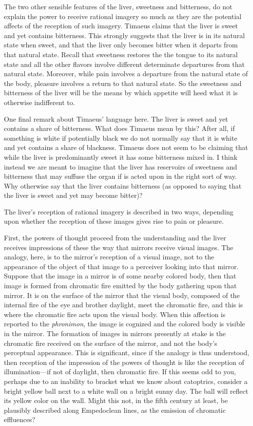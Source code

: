 The two other sensible features of the liver, sweetness and bitterness, do not explain the power to receive rational imagery so much as they are the potential affects of the reception of such imagery. Timaeus claims that the liver is sweet and yet contains bitterness. This strongly suggests that the liver is in its natural state when sweet, and that the liver only becomes bitter when it departs from that natural state. Recall that sweetness restores the the tongue to its natural state and all the other flavors involve different determinate departures from that natural state. Moreover, while pain involves a departure from the natural state of the body, pleasure involves a return to that natural state. So the sweetness and bitterness of the liver will be the means by which appetite will heed what it is otherwise indifferent to. 

One final remark about Timaeus' language here. The liver is sweet and yet contains a share of bitterness. What does Timaeus mean by this? After all, if something is white if potentially black we do not normally say that it is white and yet contains a share of blackness. Timaeus does not seem to be claiming that while the liver is predominantly sweet it has some bitterness mixed in. I think instead we are meant to imagine that the liver has reservoirs of sweetness and bitterness that may suffuse the organ if is acted upon in the right sort of way. Why otherwise say that the liver contains bitterness (as opposed to saying that the liver is sweet and yet may become bitter)?

The liver's reception of rational imagery is described in two ways, depending upon whether the reception of these images gives rise to pain or pleasure. 

First, the powers of thought proceed from the understanding and the liver receives impressions of these the way that mirrors receive visual images. The analogy, here, is to the mirror's reception of a visual image, not to the appearance of the object of that image to a perceiver looking into that mirror. Suppose that the image in a mirror is of some nearby colored body, then that image is formed from chromatic fire emitted by the body gathering upon that mirror. It is on the surface of the mirror that the visual body, composed of the internal fire of the eye and brother daylight, meet the chromatic fire, and this is where the chromatic fire acts upon the visual body. When this affection is reported to the \emph{phronimon}, the image is cognized and the colored body is visible in the mirror. The formation of images in mirrors presently at stake is the chromatic fire received on the surface of the mirror, and not the body's perceptual appearance. This is significant, since if the analogy is thus understood, then reception of the impression of the powers of thought is like the reception of illumination---if not of daylight, then chromatic fire. If this seems odd to you, perhaps due to an inability to bracket what we know about catoptrics, consider a bright yellow ball next to a white wall on a bright sunny day. The ball will reflect its yellow color on the wall. Might this not, in the fifth century at least, be plausibly described along Empedoclean lines, as the emission of chromatic effluences? 

